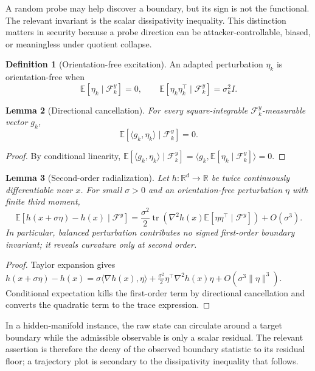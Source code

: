\documentclass[11pt]{article}
\theoremstyle{definition}
\newtheorem{definition}{Definition}[section]
\theoremstyle{plain}
\newtheorem{lemma}[definition]{Lemma}
\theoremstyle{remark}
\newcommand{\E}{\mathbb{E}}
\newcommand{\R}{\mathbb{R}}
\newcommand{\cF}{\mathcal{F}}
\begin{document}
A random probe may help discover a boundary, but its sign is not the functional. The relevant invariant is the scalar dissipativity inequality. This distinction matters in security because a probe direction can be attacker-controllable, biased, or meaningless under quotient collapse.

\begin{definition}[Orientation-free excitation]
An adapted perturbation $\eta_k$ is orientation-free when
\[
    \E[\eta_k\mid\cF_k^y]=0,
    \qquad
    \E[\eta_k\eta_k^\top\mid\cF_k^y]=\sigma_k^2 I.
\]
\end{definition}

\begin{lemma}[Directional cancellation]
For every square-integrable $\cF_k^y$-measurable vector $g_k$,
\[
    \E[\langle g_k,\eta_k\rangle\mid\cF_k^y]=0.
\]
\end{lemma}

\begin{proof}
By conditional linearity,
$\E[\langle g_k,\eta_k\rangle\mid\cF_k^y]=\langle g_k,\E[\eta_k\mid\cF_k^y]\rangle=0$.
\end{proof}

\begin{lemma}[Second-order radialization]
Let $h:\R^d\to\R$ be twice continuously differentiable near $x$. For small $\sigma>0$ and an orientation-free perturbation $\eta$ with finite third moment,
\[
    \E[h(x+\sigma\eta)-h(x)\mid\cF^y]
    =\frac{\sigma^2}{2}\operatorname{tr}\!\left(\nabla^2h(x)\E[\eta\eta^\top\mid\cF^y]\right)+O(\sigma^3).
\]
In particular, balanced perturbation contributes no signed first-order boundary invariant; it reveals curvature only at second order.
\end{lemma}

\begin{proof}
Taylor expansion gives $h(x+\sigma\eta)-h(x)=\sigma\langle\nabla h(x),\eta\rangle+\frac{\sigma^2}{2}\eta^\top\nabla^2h(x)\eta+O(\sigma^3\|\eta\|^3)$. Conditional expectation kills the first-order term by directional cancellation and converts the quadratic term to the trace expression.
\end{proof}

In a hidden-manifold instance, the raw state can circulate around a target boundary while the admissible observable is only a scalar residual. The relevant assertion is therefore the decay of the observed boundary statistic to its residual floor; a trajectory plot is secondary to the dissipativity inequality that follows.
\end{document}
